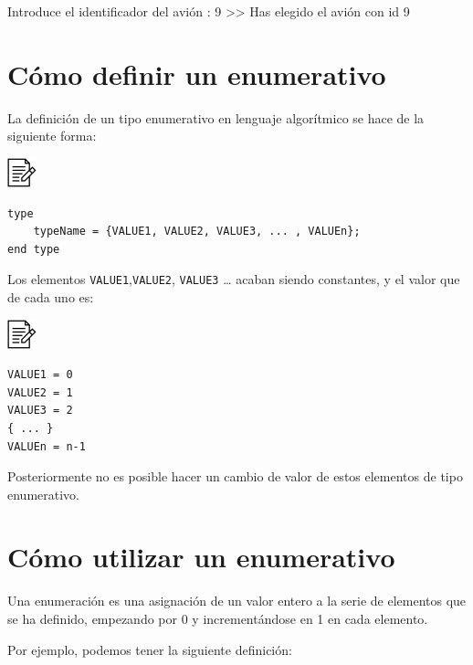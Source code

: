 \documentclass[
]{book}
\newenvironment{Shaded}{\begin{snugshade}}{\end{snugshade}}
\newcommand{\DecValTok}[1]{\textcolor[rgb]{0.00,0.00,0.81}{#1}}
\newcommand{\NormalTok}[1]{#1}
\begin{document}
\begin{Shaded}
\begin{Highlighting}[]
\NormalTok{Introduce el identificador del avión : }\DecValTok{9}
\NormalTok{\textgreater{}\textgreater{} Has elegido el avión con id }\DecValTok{9} 
\end{Highlighting}
\end{Shaded}

\hypertarget{cuxf3mo-definir-un-enumerativo}{%
\section{Cómo definir un enumerativo}\label{cuxf3mo-definir-un-enumerativo}}

La definición de un tipo enumerativo en lenguaje algorítmico se hace de la siguiente forma:

\includegraphics{./img/alg.png}

\begin{verbatim}
type
    typeName = {VALUE1, VALUE2, VALUE3, ... , VALUEn};
end type
\end{verbatim}

Los elementos \texttt{VALUE1},\texttt{VALUE2}, \texttt{VALUE3} \ldots{} acaban siendo constantes, y el valor que de cada uno es:

\includegraphics{./img/alg.png}

\begin{verbatim}
VALUE1 = 0
VALUE2 = 1
VALUE3 = 2 
{ ... }
VALUEn = n-1
\end{verbatim}

Posteriormente no es posible hacer un cambio de valor de estos elementos de tipo enumerativo.

\hypertarget{cuxf3mo-utilizar-un-enumerativo}{%
\section{Cómo utilizar un enumerativo}\label{cuxf3mo-utilizar-un-enumerativo}}

Una enumeración es una asignación de un valor entero a la serie de elementos que se ha definido, empezando por 0 y incrementándose en 1 en cada elemento.

Por ejemplo, podemos tener la siguiente definición:
\end{document}
